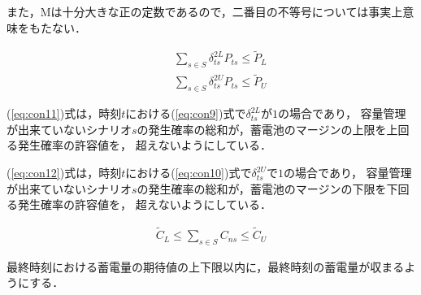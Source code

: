 \documentclass[a4paper,12pt,showkeys]{jreport}
\begin{document}
また，Mは十分大きな正の定数であるので，二番目の不等号については事実上意味をもたない．


\begin{eqnarray}
&& \sum_{s \in S} \delta^{2L}_{ts} P_{ts} \le \tilde{P}_L
\label{eq:con11} \\
&& \sum_{s \in S} \delta^{2U}_{ts} P_{ts} \le \tilde{P}_U
\label{eq:con12}
\end{eqnarray}

(\ref{eq:con11})式は，時刻$t$における(\ref{eq:con9})式で$\delta^{2L}_{ts}$が$1$の場合であり，
容量管理が出来ていないシナリオ$s$の発生確率の総和が，蓄電池のマージンの上限を上回る発生確率の許容値を，
超えないようにしている．

(\ref{eq:con12})式は，時刻$t$における(\ref{eq:con10})式で$\delta^{2U}_{ts}$で$1$の場合であり，
容量管理が出来ていないシナリオ$s$の発生確率の総和が，蓄電池のマージンの下限を下回る発生確率の許容値を，
超えないようにしている．

\begin{eqnarray}
\tilde{C}_L \le \sum_{s \in S} C_{ns} \le \tilde{C}_U
\label{eq:con13}
\end{eqnarray}

最終時刻における蓄電量の期待値の上下限以内に，最終時刻の蓄電量が収まるようにする．

\end{document}

